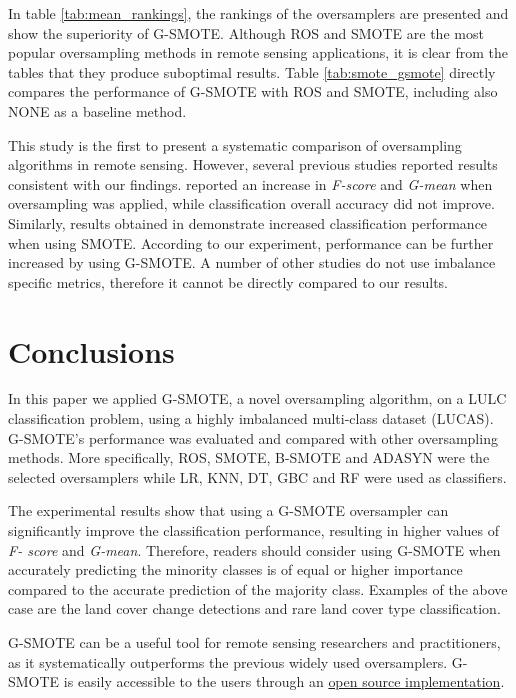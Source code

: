 \documentclass[remotesensing,article,submit,moreauthors,pdftex]{Definitions/mdpi}
\begin{document}
In table \ref{tab:mean_rankings}, the rankings of the oversamplers are presented
and show the superiority of G-SMOTE. Although ROS and SMOTE are the most popular
oversampling methods in remote sensing applications, it is clear from the tables
that they produce suboptimal results. Table \ref{tab:smote_gsmote} directly compares the performance of G-SMOTE with ROS and SMOTE, including also NONE as a baseline method.

This study is the first to present a systematic comparison of oversampling
algorithms in remote sensing. However, several previous studies reported results
consistent with our findings. \cite{Bogner2018} reported an increase in
\textit{F-score} and \textit{G-mean} when oversampling was applied, while
classification overall accuracy did not improve. Similarly, results obtained in
\cite{Feng2019} demonstrate increased classification performance when using
SMOTE. According to our experiment, performance can be further increased by
using G-SMOTE. A number of other studies \cite{Cenggoro2018, Maxwell2018} do not
use imbalance specific metrics, therefore it cannot be directly compared to our
results.

\section{Conclusions}

In this paper we applied G-SMOTE, a novel oversampling algorithm, on a LULC
classification problem, using a highly imbalanced multi-class dataset (LUCAS).
G-SMOTE's performance was evaluated and compared with other oversampling
methods. More specifically, ROS, SMOTE, B-SMOTE and ADASYN were the selected
oversamplers while LR, KNN, DT, GBC and RF were used as classifiers.

The experimental results show that using a G-SMOTE oversampler can significantly
improve the classification performance, resulting in higher values of \textit{F-
score} and \textit{G-mean}. Therefore, readers should consider using G-SMOTE
when accurately predicting the minority classes is of equal or higher importance
compared to the accurate prediction of the majority class. Examples of the above
case are the land cover change detections and rare land cover type
classification.

G-SMOTE can be a useful tool for remote sensing researchers and practitioners,
as it systematically outperforms the previous widely used oversamplers.
G-SMOTE is easily accessible to the users through an
\href{https://geometric-smote.readthedocs.io/en/latest/?badge=latest}{open
	source implementation}.
\end{document}

